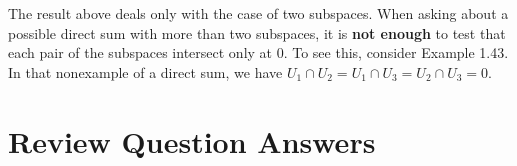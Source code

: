 \documentclass[12pt, letterpaper, oneside]{book}
\begin{document}
\begin{displayquote}
  The result above deals only with the case of two subspaces. When asking about
  a possible direct sum with more than two subspaces, it is \textbf{not enough}
  to test that each pair of the subspaces intersect only at 0. To see this,
  consider Example 1.43. In that nonexample of a direct sum, we have $U_1 \cap
  U_2 = U_1 \cap U_3 = U_2 \cap U_3 = {0}.$
\end{displayquote}

\section{Review Question Answers}
\end{document}
